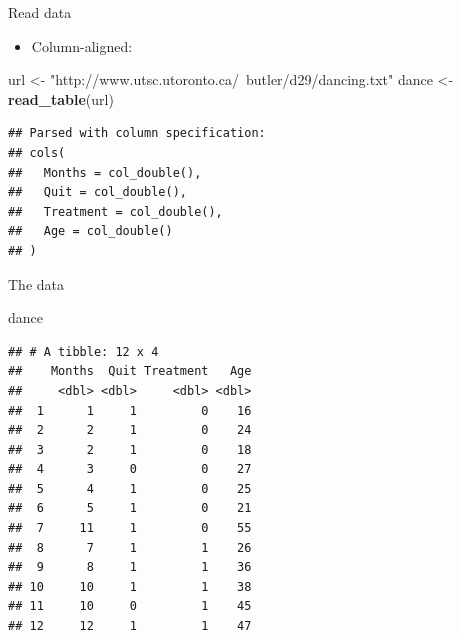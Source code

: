 \documentclass[ignorenonframetext,]{beamer}
\newenvironment{Shaded}{\begin{snugshade}}{\end{snugshade}}
\newcommand{\KeywordTok}[1]{\textcolor[rgb]{0.13,0.29,0.53}{\textbf{#1}}}
\newcommand{\NormalTok}[1]{#1}
\newcommand{\StringTok}[1]{\textcolor[rgb]{0.31,0.60,0.02}{#1}}
\providecommand{\tightlist}{%
  \setlength{\itemsep}{0pt}\setlength{\parskip}{0pt}}
\begin{document}
\begin{frame}[fragile]{Read data}
\protect\hypertarget{read-data}{}

\begin{itemize}
\tightlist
\item
  Column-aligned:
\end{itemize}

\normalsize

\begin{Shaded}
\begin{Highlighting}[]
\NormalTok{url <-}\StringTok{ "http://www.utsc.utoronto.ca/~butler/d29/dancing.txt"}
\NormalTok{dance <-}\StringTok{ }\KeywordTok{read_table}\NormalTok{(url)}
\end{Highlighting}
\end{Shaded}

\begin{verbatim}
## Parsed with column specification:
## cols(
##   Months = col_double(),
##   Quit = col_double(),
##   Treatment = col_double(),
##   Age = col_double()
## )
\end{verbatim}

\normalsize

\end{frame}

\begin{frame}[fragile]{The data}
\protect\hypertarget{the-data-5}{}

\small

\begin{Shaded}
\begin{Highlighting}[]
\NormalTok{dance}
\end{Highlighting}
\end{Shaded}

\begin{verbatim}
## # A tibble: 12 x 4
##    Months  Quit Treatment   Age
##     <dbl> <dbl>     <dbl> <dbl>
##  1      1     1         0    16
##  2      2     1         0    24
##  3      2     1         0    18
##  4      3     0         0    27
##  5      4     1         0    25
##  6      5     1         0    21
##  7     11     1         0    55
##  8      7     1         1    26
##  9      8     1         1    36
## 10     10     1         1    38
## 11     10     0         1    45
## 12     12     1         1    47
\end{verbatim}

\normalsize

\end{frame}
\end{document}
